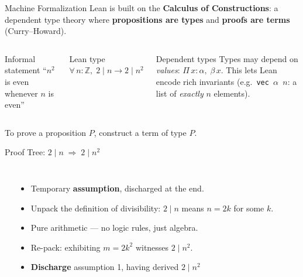 \documentclass{beamer}
\begin{document}
\begin{frame}{Machine Formalization}
  Lean is built on the \textbf{Calculus of Constructions}: a dependent type theory where
  \textbf{propositions are types} and \textbf{proofs are terms} (Curry--Howard).
  \vspace{0.5em}
  \begin{columns}
    \begin{block}{Informal statement}
      ``$n^2$ is even whenever $n$ is even''
    \end{block}
    \begin{block}{Lean type}
      \small\ttfamily
      $\forall\, n : \mathbb{Z},\; 2 \mid n \to 2 \mid n^2$
    \end{block}
    \begin{block}{Dependent types}
      Types may depend on \emph{values}: $\Pi\, x{:}\alpha,\; \beta\, x$.
      This lets Lean encode rich invariants (e.g.\ \texttt{vec\,$\alpha$\,$n$}: a list of \emph{exactly} $n$ elements).
    \end{block}
  \end{columns}
  \vspace{0.5em}
  To prove a proposition $P$, construct a term of type $P$.
\end{frame}

\begin{frame}[fragile]{Proof Tree: $2 \mid n \;\Rightarrow\; 2 \mid n^2$}
  \begin{columns}
    \begin{prooftree}
    \end{prooftree}

    \small
    \begin{itemize}
      \item[{$[\ ]^1$}] Temporary \textbf{assumption}, discharged at the end.
      \item[{$\exists$E}] Unpack the definition of divisibility: $2\mid n$ means $n=2k$ for some $k$.
      \item[{calc}] Pure arithmetic --- no logic rules, just algebra.
      \item[{$\exists$I}] Re-pack: exhibiting $m = 2k^2$ witnesses $2 \mid n^2$.
      \item[{${\to}$I$^1$}] \textbf{Discharge} assumption 1, having derived $2\mid n^2$
    \end{itemize}
  \end{columns}
\end{frame}
\end{document}
